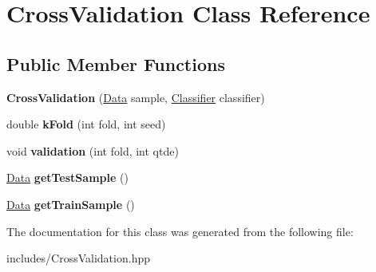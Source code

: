 \hypertarget{class_cross_validation}{}\section{Cross\+Validation Class Reference}
\label{class_cross_validation}
\subsection*{Public Member Functions}
\begin{DoxyCompactItemize}
\item 
\mbox{\label{class_cross_validation_af35049a91d0f930649368a540fc2820c}} 
{\bfseries Cross\+Validation} (\hyperlink{class_data}{Data} sample, \hyperlink{class_classifier}{Classifier} classifier)
\item 
\mbox{\label{class_cross_validation_a2b0f80b43a7cc4d0cb2ecf35ff753e02}} 
double {\bfseries k\+Fold} (int fold, int seed)
\item 
\mbox{\label{class_cross_validation_a23fcc984772d8e9041aefd5e936aac10}} 
void {\bfseries validation} (int fold, int qtde)
\item 
\mbox{\label{class_cross_validation_add4e6fd96aa64cd4397e4c86a83f6516}} 
\hyperlink{class_data}{Data} {\bfseries get\+Test\+Sample} ()
\item 
\mbox{\label{class_cross_validation_a2dfd4e1f68f5e4c318077ba839ad93c2}} 
\hyperlink{class_data}{Data} {\bfseries get\+Train\+Sample} ()
\end{DoxyCompactItemize}


The documentation for this class was generated from the following file\+:\begin{DoxyCompactItemize}
\item 
includes/Cross\+Validation.\+hpp\end{DoxyCompactItemize}
